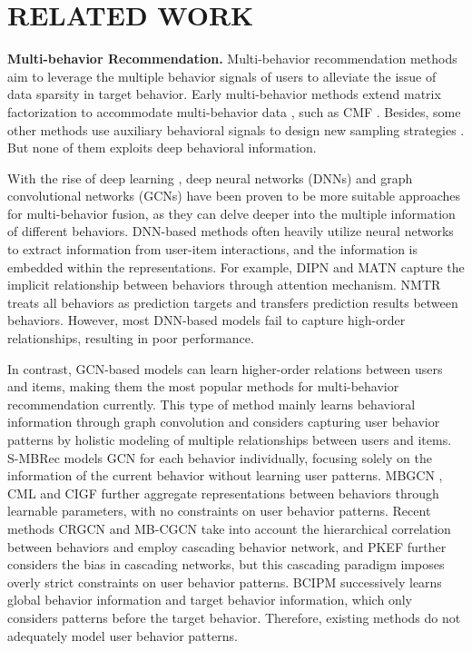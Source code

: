 \section{RELATED WORK}
\label{related_work}
\textbf{Multi-behavior Recommendation.}
Multi-behavior recommendation methods aim to leverage the multiple behavior signals of users to alleviate the issue of data sparsity in target behavior. Early multi-behavior methods extend matrix factorization to accommodate multi-behavior data \cite{mf1,mf2,mf3}, such as CMF \cite{cmf}. Besides, some other methods use auxiliary behavioral signals to design new sampling strategies \cite{bprh,mc-bpr,bpr_resolve, vals}. But none of them exploits deep behavioral information.

With the rise of deep learning \cite{chengqing2023multi,liang2023knowledge,li2024dual,dang2023uniform}, deep neural networks (DNNs) and graph convolutional networks (GCNs) have been proven to be more suitable approaches for multi-behavior fusion, as they can delve deeper into the multiple information of different behaviors. 
DNN-based methods often heavily utilize neural networks to extract information from user-item interactions, and the information is embedded within the representations. For example, DIPN \cite{dipn} and MATN \cite{matn} capture the implicit relationship between behaviors through attention mechanism. NMTR \cite{nmtr} treats all behaviors as prediction targets and transfers prediction results between behaviors. However, most DNN-based models fail to capture high-order relationships, resulting in poor performance. 

In contrast, GCN-based models can learn higher-order relations between users and items, making them the most popular methods for multi-behavior recommendation currently. This type of method mainly learns behavioral information through graph convolution and considers capturing user behavior patterns by holistic modeling of multiple relationships between users and items. S-MBRec \cite{smbrec} models GCN for each behavior individually, focusing solely on the information of the current behavior without learning user patterns. MBGCN \cite{mbgcn}, CML \cite{CML} and CIGF \cite{cigf} further aggregate representations between behaviors through learnable parameters, with no constraints on user behavior patterns. Recent methods CRGCN \cite{crgcn} and MB-CGCN \cite{mbcgcn} take into account the hierarchical correlation between behaviors and employ cascading behavior network, and PKEF \cite{pkef} further considers the bias in cascading networks, but this cascading paradigm imposes overly strict constraints on user behavior patterns. BCIPM \cite{bipn} successively learns global behavior information and target behavior information, which only considers patterns before the target behavior. Therefore, existing methods do not adequately model user behavior patterns.

